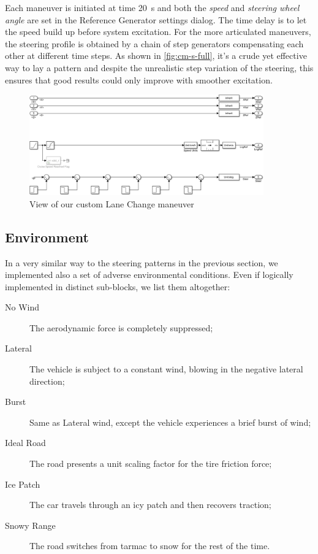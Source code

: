 		Each maneuver is initiated at time \SI{20}{\second} and both the \emph{speed} and \emph{steering wheel angle} are set in the Reference Generator settings dialog.
		The time delay is to let the speed build up before system excitation. For the more articulated maneuvers, the steering profile is obtained by a chain of step generators
		compensating each other at different time steps. As shown in \vref{fig:cm-s-full}, it's a crude yet effective way to lay a pattern and despite the unrealistic step variation of the steering, this ensures that
		good results could only improve with smoother excitation.
		\begin{figure}[hbt]
			\centering
			\includegraphics[width=0.9\textwidth]{Images/Simulator/cm-s-full}
			\caption{View of our custom Lane Change maneuver}
			\label{fig:cm-s-full}
		\end{figure}


		\subsection{Environment}

		In a very similar way to the steering patterns in the previous section, we implemented also a set of adverse environmental conditions.
		Even if logically implemented in distinct sub-blocks, we list them altogether:
		\begin{description}

			\item[No Wind] The aerodynamic force is completely suppressed;

			\item[Lateral] The vehicle is subject to a constant wind, blowing in the negative lateral direction;

			\item[Burst] Same as Lateral wind, except the vehicle experiences a brief burst of wind;

			\item[Ideal Road] The road presents a unit scaling factor for the tire friction force;

			\item[Ice Patch] The car travels through an icy patch and then recovers traction;

			\item[Snowy Range] The road switches from tarmac to snow for the rest of the time.

		\end{description}


